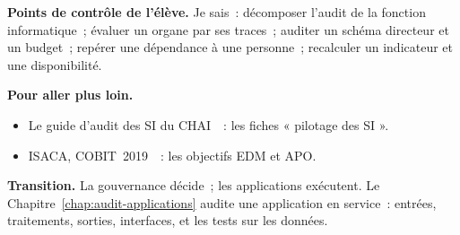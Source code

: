 \bigskip

\begin{boxinfo}
\textbf{Points de contrôle de l'élève.} Je sais~: décomposer l'audit de la
fonction informatique~; évaluer un organe par ses traces~; auditer un
schéma directeur et un budget~; repérer une dépendance à une personne~;
recalculer un indicateur et une disponibilité.
\end{boxinfo}

\begin{boxinfo}
\textbf{Pour aller plus loin.}
\begin{itemize}
    \item Le guide d'audit des SI du CHAI~\cite{chai2014guide}~: les fiches
          « pilotage des SI ».
    \item ISACA, COBIT~2019~\cite{isaca2018cobitobjectifs}~: les objectifs
          EDM et APO.
\end{itemize}
\end{boxinfo}

\begin{boxinfo}
\textbf{Transition.} La gouvernance décide~; les applications exécutent.
Le Chapitre~\ref{chap:audit-applications} audite une application en
service~: entrées, traitements, sorties, interfaces, et les tests sur les
données.
\end{boxinfo}
